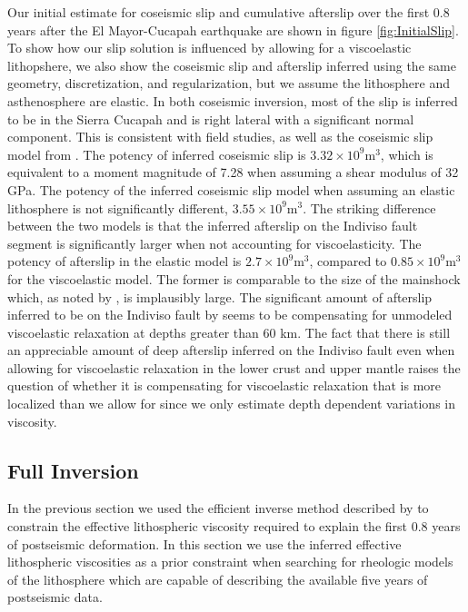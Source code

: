\documentclass[1p]{elsarticle}
\begin{document}
Our initial estimate for coseismic slip and cumulative afterslip over the first 0.8 years after the El Mayor-Cucapah earthquake are shown in figure \ref{fig:InitialSlip}. To show how our slip solution is influenced by allowing for a viscoelastic lithopshere, we also show the coseismic slip and afterslip inferred using the same geometry, discretization, and regularization, but we assume the lithosphere and asthenosphere are elastic.  In both coseismic inversion, most of the slip is inferred to be in the Sierra Cucapah and is right lateral with a significant normal component. This is consistent with field studies, \cite{Fletcher2014} as well as the coseismic slip model from \cite{Wei2011}.  The potency of inferred coseismic slip is $3.32\times 10^{9} \mathrm{m}^3$, which is equivalent to a moment magnitude of 7.28 when assuming a shear modulus of 32 GPa. The potency of the inferred coseismic slip model when assuming an elastic lithosphere is not significantly different, $3.55\times 10^9 \mathrm{m}^3$.  The striking difference between the two models is that the inferred afterslip on the Indiviso fault segment is significantly larger when not accounting for viscoelasticity.  The potency of afterslip in the elastic model is $2.7\times 10^9 \mathrm{m}^3$, compared to $0.85\times 10^9 \mathrm{m}^3$ for the viscoelastic model.  The former is comparable to the size of the mainshock which, as noted by \cite{Rollins2015}, is implausibly large. The significant amount of afterslip inferred to be on the Indiviso fault by \cite{Rollins2015} seems to be compensating for unmodeled viscoelastic relaxation at depths greater than $60$ km.   The fact that there is still an appreciable amount of deep afterslip inferred on the Indiviso fault even when allowing for viscoelastic relaxation in the lower crust and upper mantle raises the question of whether it is compensating for viscoelastic relaxation that is more localized than we allow for since we only estimate depth dependent variations in viscosity.  
 
 
\subsection{Full Inversion}\label{sec:FullInversion} 

In the previous section we used the efficient inverse method described by \cite{Hines2015} to constrain the effective lithospheric viscosity required to explain the first 0.8 years of postseismic deformation. In this section we use the inferred effective lithospheric viscosities as a prior constraint when searching for rheologic models of the lithosphere which are capable of describing the available five years of postseismic data.   
\end{document}
